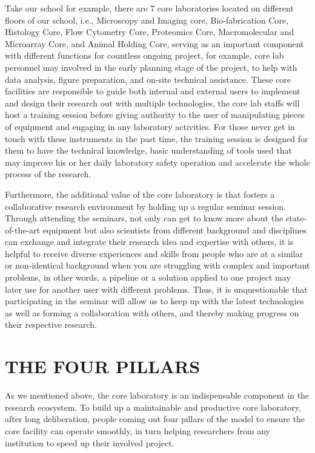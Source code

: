 \documentclass[12pt]{article}
\begin{document}
Take our school for example, there are 7 core laboratories located on different floors of our school, i.e., Microscopy and Imaging core, Bio-fabrication Core, Histology Core, Flow Cytometry Core, Proteomics Core, Macromolecular and Microarray Core, and Animal Holding Core, serving as an important component with different functions for countless ongoing project, for example, core lab personnel may involved in the early planning stage of the project, to help with data analysis, figure preparation, and on-site technical assistance. These core facilities are responsible to guide both internal and external users to implement and design their research out with multiple technologies, the core lab staffs will host a training session before giving authority to the user of manipulating pieces of equipment and engaging in any laboratory activities. For those never get in touch with these instruments in the past time, the training session is designed for them to have the technical knowledge, basic understanding of tools used that may improve his or her daily laboratory safety operation and accelerate the whole process of the research.
\medskip

Furthermore, the additional value of the core laboratory is that fosters a collaborative research environment by holding up a regular seminar session. Through attending the seminars, not only can get to know more about the state-of-the-art equipment but also scientists from different background and disciplines can exchange and integrate their research idea and expertise with others, it is helpful to receive diverse experiences and skills from people who are at a similar or non-identical background when you are struggling with complex and important problems, in other words, a pipeline or a solution applied to one project may later use for another user with different problems. Thus, it is unquestionable that participating in the seminar will allow us to keep up with the latest technologies as well as forming a collaboration with others, and thereby making progress on their respective research. 

\section{THE FOUR PILLARS}
As we mentioned above, the core laboratory is an indispensable component in the research ecosystem. To build up a maintainable and productive core laboratory, after long deliberation, people coming out four pillars of the model to ensure the core facility can operate smoothly, in turn helping researchers from any institution to speed up their involved project.
\end{document}
